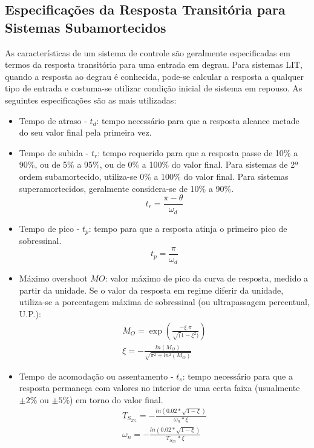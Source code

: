 \subsection{Especificações da Resposta Transitória para Sistemas Subamortecidos}
As características de um sistema de controle são geralmente especificadas em termos da resposta transitória para uma entrada em degrau. Para sistemas LIT, quando a resposta ao degrau é conhecida, pode-se calcular a resposta a qualquer tipo de entrada e costuma-se utilizar condição inicial de sistema em repouso. As seguintes especificações são as mais utilizadas:
\begin{itemize}
    \item  Tempo de atraso - $t_d$: tempo necessário para que a resposta alcance metade do seu valor final pela primeira vez.
    \item  Tempo de subida - $t_r$: tempo requerido para que a resposta passe de 10\% a 90\%, ou de 5\% a 95\%, ou de 0\% a 100\% do valor final. Para sistemas de 2ª ordem subamortecido, utiliza-se 0\% a 100\% do valor final. Para sistemas superamortecidos, geralmente considera-se de 10\% a 90\%.
    \begin{equation} \label{eq:tr}
        t_r = \frac{\pi-\theta}{\omega_d}
    \end{equation} 
    \item Tempo de pico - $t_p$: tempo para que a resposta atinja o primeiro pico de sobressinal.
    \begin{equation} \label{eq:tp}
        t_p = \frac{\pi}{\omega_d}
    \end{equation}
    \item Máximo overshoot $MO$: valor máximo de pico da curva de resposta, medido a partir da unidade. Se o valor da resposta em regime diferir da unidade, utiliza-se a porcentagem máxima de sobressinal (ou ultrapassagem percentual, U.P.):
    \begin{equation} \label{eq:MaxOv}
        \begin{split}
            M_O=\exp{(\frac{-\xi.\pi}{\sqrt(1-\xi^2)})}\\
            \xi=-\frac{ln\left( M_O \right)}{\sqrt{\pi^2+ln^2(M_O)}}
        \end{split}
    \end{equation}
    \item Tempo de acomodação ou assentamento - $t_s$: tempo necessário para que a resposta permaneça com valores no interior de uma certa faixa (usualmente $\pm2\%$ ou $\pm5\%$) em torno do valor final.
    \begin{equation} \label{eq:Ts2}
        \begin{split}
            T_{S_{2\%}}=-\frac{ln\left( 0.02*\sqrt{1-\xi} \right)}{\omega_n*\xi}\\
            \omega_n=-\frac{ln\left( 0.02*\sqrt{1-\xi} \right)}{T_{S_{2\%}}*\xi}  
        \end{split}
    \end{equation}
\end{itemize}

